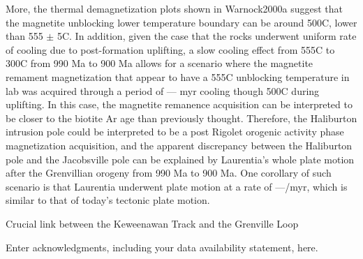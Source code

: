 \documentclass[draft]{agujournal2019}
\begin{document}
More, the thermal demagnetization plots shown in Warnock2000a suggest that the magnetite unblocking lower temperature boundary can be around 500\textdegree C, lower than 555 $\pm$ 5\textdegree C. In addition, given the case that the rocks underwent uniform rate of cooling due to post-formation uplifting, a slow cooling effect from 555\textdegree C to 300\textdegree C from 990 Ma to 900 Ma allows for a scenario where the magnetite remament magnetization that appear to have a 555\textdegree C unblocking temperature in lab was acquired through a period of --- myr cooling though 500\textdegree C during uplifting. In this case, the magnetite remanence acquisition can be interpreted to be closer to the biotite Ar age than previously thought. Therefore, the Haliburton intrusion pole could be interpreted to be a post Rigolet orogenic activity phase magnetization acquisition, and the apparent discrepancy between the Haliburton pole and the Jacobsville pole can be explained by Laurentia's whole plate motion after the Grenvillian orogeny from 990 Ma to 900 Ma. One corollary of such scenario is that Laurentia underwent plate motion at a rate of ---\textdegree/myr, which is similar to that of today's tectonic plate motion. 

Crucial link between the Keweenawan Track and the Grenville Loop



\acknowledgments
Enter acknowledgments, including your data availability statement, here.



\end{document}
